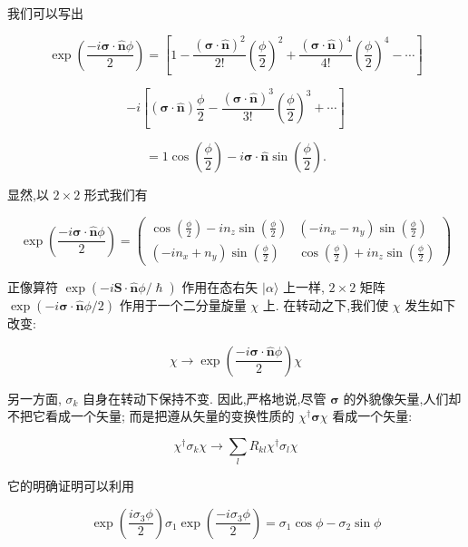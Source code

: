 我们可以写出

$$
\exp \left( \frac{-i\mathbf{\sigma } \cdot \widehat{\mathbf{n}}\phi }{2}\right) = \left\lbrack {1 - \frac{{\left( \mathbf{\sigma } \cdot \widehat{\mathbf{n}}\right) }^{2}}{2!}{\left( \frac{\phi }{2}\right) }^{2} + \frac{{\left( \mathbf{\sigma } \cdot \widehat{\mathbf{n}}\right) }^{4}}{4!}{\left( \frac{\phi }{2}\right) }^{4} - \cdots }\right\rbrack
$$

$$
- i\left\lbrack {\left( {\mathbf{\sigma } \cdot \widehat{\mathbf{n}}}\right) \frac{\phi }{2} - \frac{{\left( \mathbf{\sigma } \cdot \widehat{\mathbf{n}}\right) }^{3}}{3!}{\left( \frac{\phi }{2}\right) }^{3} + \cdots }\right\rbrack 
$$

$$
= 1\cos \left( \frac{\phi }{2}\right) - i\mathbf{\sigma } \cdot \widehat{\mathbf{n}}\sin \left( \frac{\phi }{2}\right) .
$$

显然,以 $2 \times 2$ 形式我们有

$$
\exp \left( \frac{-i\mathbf{\sigma } \cdot \widehat{\mathbf{n}}\phi }{2}\right) = \left( \begin{array}{ll} \cos \left( \frac{\phi }{2}\right) - i{n}_{z}\sin \left( \frac{\phi }{2}\right) & \left( {-i{n}_{x} - {n}_{y}}\right) \sin \left( \frac{\phi }{2}\right) \\ \left( {-i{n}_{x} + {n}_{y}}\right) \sin \left( \frac{\phi }{2}\right) & \cos \left( \frac{\phi }{2}\right) + i{n}_{z}\sin \left( \frac{\phi }{2}\right) \end{array}\right) 
$$

正像算符 $\exp \left( {-i\mathbf{S} \cdot \widehat{\mathbf{n}}\phi /\hslash }\right)$ 作用在态右矢 $|\alpha \rangle$ 上一样, $2 \times 2$ 矩阵 $\exp \left( {-i\mathbf{\sigma } \cdot \widehat{\mathbf{n}}\phi /2}\right)$ 作用于一个二分量旋量 $\chi$ 上. 在转动之下,我们使 $\chi$ 发生如下改变:

$$
\chi \rightarrow \exp \left( \frac{-i\mathbf{\sigma } \cdot \widehat{\mathbf{n}}\phi }{2}\right) \chi
$$

另一方面, ${\sigma }_{k}$ 自身在转动下保持不变. 因此,严格地说,尽管 $\mathbf{\sigma }$ 的外貌像矢量,人们却不把它看成一个矢量; 而是把遵从矢量的变换性质的 ${\chi }^{ \dagger }\mathbf{\sigma }\chi$ 看成一个矢量:

$$
{\chi }^{ \dagger }{\sigma }_{k}\chi \rightarrow \mathop{\sum }\limits_{l}{R}_{kl}{\chi }^{ \dagger }{\sigma }_{l}\chi 
$$

它的明确证明可以利用

$$
\exp \left( \frac{i{\sigma }_{3}\phi }{2}\right) {\sigma }_{1}\exp \left( \frac{-i{\sigma }_{3}\phi }{2}\right) = {\sigma }_{1}\cos \phi - {\sigma }_{2}\sin \phi
$$

